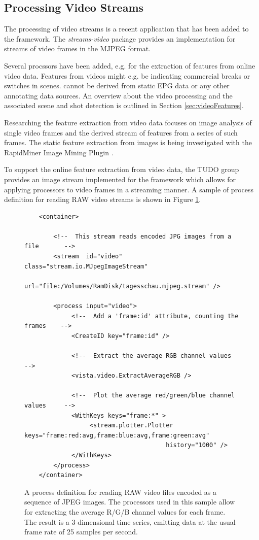 \subsection{\label{sec:videoStreams}Processing Video Streams}
\baustelle The processing of video streams is a recent application
that has been added to the \streams framework. The {\em streams-video}
package provides an implementation for streams of video frames in the
MJPEG format.

Several procssors have been added, e.g. for the extraction of features
from online video data. Features from videos might e.g. be indicating
commercial breaks or switches in scenes. 
cannot be derived from static EPG data or any other annotating data
sources. An overview about the video processing and the associated
scene and shot detection is outlined in Section
\ref{sec:videoFeatures}.

Researching the feature extraction from video data focuses on image
analysis of single video frames and the derived stream of features from
a series of such frames. The static feature extraction from images is
being investigated with the RapidMiner Image Mining Plugin \cite{Burget2010a}.

To support the online feature extraction from video data, the TUDO
group provides an image stream implemented for the \streams framework
which allows for applying processors to video frames in a streaming
manner. A sample of process definition for reading RAW video streams
is shown in Figure \ref{fig:videoXml}.

\begin{figure}[h!]
  \centering
  \begin{lstlisting}
    <container>

        <!--  This stream reads encoded JPG images from a file       -->    
        <stream  id="video" class="stream.io.MJpegImageStream"
                url="file:/Volumes/RamDisk/tagesschau.mjpeg.stream" />

        <process input="video">
             <!--  Add a 'frame:id' attribute, counting the frames    -->
             <CreateID key="frame:id" />
        
             <!--  Extract the average RGB channel values             -->
             <vista.video.ExtractAverageRGB />

             <!--  Plot the average red/green/blue channel values     -->         
             <WithKeys keys="frame:*" >
                  <stream.plotter.Plotter keys="frame:red:avg,frame:blue:avg,frame:green:avg"
                                       history="1000" />
             </WithKeys>
        </process>
    </container>
  \end{lstlisting}
  \caption{\label{fig:videoXml}A process definition for reading RAW
    video files encoded as a sequence of JPEG images. The processors
    used in this sample allow for extracting the average R/G/B channel
    values for each frame. The result is a 3-dimensional time series,
    emitting data at the usual frame rate of 25 samples per second.}
\end{figure}

